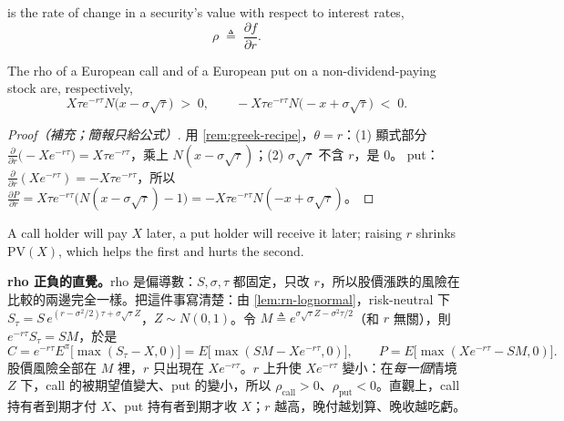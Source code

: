 
\begin{definition}
	 is the rate of change in a security's value with respect to interest rates,
	\[
		\rho \;\triangleq\; \frac{\partial f}{\partial r} .
	\]
\end{definition}

\begin{proposition}
	The rho of a European call and of a European put on a non-dividend-paying stock are, respectively,
	\[
		X\tau e^{-r\tau}N\bigl(x-\sigma\sqrt{\tau}\bigr) \;>\; 0 ,
		\qquad
		-X\tau e^{-r\tau}N\bigl(-x+\sigma\sqrt{\tau}\bigr) \;<\; 0 .
	\]
\end{proposition}

\suppstart
\begin{proof}[Proof（補充；簡報只給公式）]
	用 \autoref{rem:greek-recipe}，$\theta=r$：(1) 顯式部分 $\frac{\partial}{\partial r}\bigl(-Xe^{-r\tau}\bigr)=X\tau e^{-r\tau}$，乘上 $N(x-\sigma\sqrt{\tau})$；(2) $\sigma\sqrt{\tau}$ 不含 $r$，是 $0$。
	put：$\frac{\partial}{\partial r}(Xe^{-r\tau})=-X\tau e^{-r\tau}$，所以 $\frac{\partial P}{\partial r}=X\tau e^{-r\tau}\bigl(N(x-\sigma\sqrt{\tau})-1\bigr)=-X\tau e^{-r\tau}N(-x+\sigma\sqrt{\tau})$。
\end{proof}

A call holder will pay $X$ later, a put holder will receive it later; raising $r$ shrinks $\mathrm{PV}(X)$, which helps the first and hurts the second.


\begin{remark}
	\textbf{rho 正負的直覺。}rho 是偏導數：$S,\sigma,\tau$ 都固定，只改 $r$，所以股價漲跌的風險在比較的兩邊完全一樣。把這件事寫清楚：由 \autoref{lem:rn-lognormal}，risk-neutral 下 $S_{\tau}=S\,e^{(r-\sigma^{2}/2)\tau+\sigma\sqrt{\tau}Z}$，$Z\sim N(0,1)$。令 $M\triangleq e^{\sigma\sqrt{\tau}Z-\sigma^{2}\tau/2}$（和 $r$ 無關），則 $e^{-r\tau}S_{\tau}=SM$，於是
	\[
		C=e^{-r\tau}E^{\pi}\bigl[\max(S_{\tau}-X,0)\bigr]=E\bigl[\max(SM-Xe^{-r\tau},0)\bigr] ,
		\qquad
		P=E\bigl[\max(Xe^{-r\tau}-SM,0)\bigr] .
	\]
	股價風險全部在 $M$ 裡，$r$ 只出現在 $Xe^{-r\tau}$。$r$ 上升使 $Xe^{-r\tau}$ 變小：在\emph{每一個}情境 $Z$ 下，call 的被期望值變大、put 的變小，所以 $\rho_{\text{call}}>0$、$\rho_{\text{put}}<0$。直觀上，call 持有者到期才付 $X$、put 持有者到期才收 $X$；$r$ 越高，晚付越划算、晚收越吃虧。
\end{remark}
\suppend

